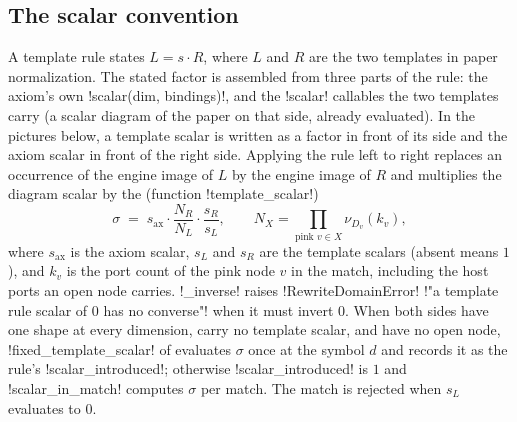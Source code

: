 \begin{center}
\end{center}

\subsection{The scalar convention}\label{sec:completeness-scalar}

A template rule states $L = s\cdot R$, where $L$ and $R$ are the two templates in paper
normalization. The stated factor is assembled from three parts of the rule: the axiom's own
\py!scalar(dim, bindings)!, and the \py!scalar! callables the two templates carry (a scalar
diagram of the paper on that side, already evaluated). In the pictures below, a template scalar is
written as a factor in front of its side and the axiom scalar in front of the right side. Applying the
rule left to right replaces an occurrence of the engine image of $L$ by the engine image of $R$
and multiplies the diagram scalar by the  (function \py!template_scalar!)
\begin{equation}\label{eq:completeness-engine-scalar}
  \sigma \;=\; s_{\mathrm{ax}}\cdot\frac{N_R}{N_L}\cdot\frac{s_R}{s_L},
  \qquad N_X=\prod_{\text{pink }v\in X}\nu_{D_v}(k_v),
\end{equation}
where $s_{\mathrm{ax}}$ is the axiom scalar, $s_L$ and $s_R$ are the template scalars (absent means
$1$), and $k_v$ is the port count of the pink node $v$ in the match, including the host ports an
open node carries. \py!_inverse! raises \py!RewriteDomainError!
\code!"a template rule scalar of 0 has no converse"! when it must invert $0$. When both sides
have one shape at every dimension, carry no template scalar, and have no open node,
\py!fixed_template_scalar! of  evaluates $\sigma$ once at
the symbol $d$ and records it as the rule's \py!scalar_introduced!; otherwise
\py!scalar_introduced! is $1$ and \py!scalar_in_match! computes $\sigma$ per match. The match is
rejected when $s_L$ evaluates to $0$.

